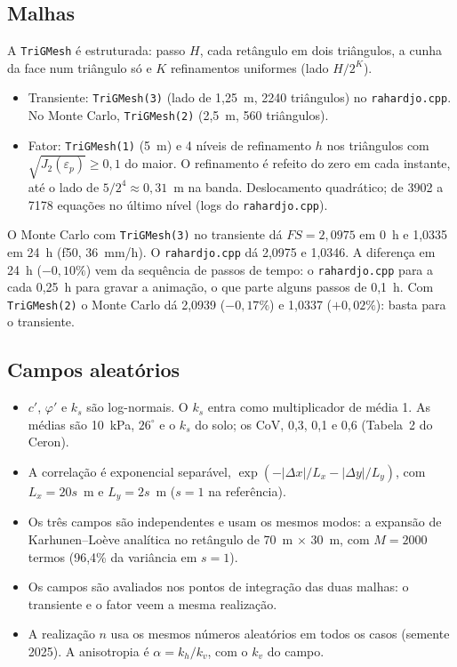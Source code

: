 \documentclass[11pt,a4paper]{article}
\begin{document}
\subsection{Malhas}
A \texttt{TriGMesh} é estruturada: passo $H$, cada retângulo em dois triângulos, a cunha da face num triângulo só e $K$
refinamentos uniformes (lado $H/2^K$).
\begin{itemize}
\item Transiente: \texttt{TriGMesh(3)} (lado de 1,25~m, 2240 triângulos) no \texttt{rahardjo.cpp}. No Monte Carlo,
\texttt{TriGMesh(2)} (2,5~m, 560 triângulos).
\item Fator: \texttt{TriGMesh(1)} (5~m) e 4 níveis de refinamento $h$ nos triângulos com
$\sqrt{J_2(\varepsilon_p)} \geq 0{,}1$ do maior. O refinamento é refeito do zero em cada instante, até o lado de
$5/2^4 \approx 0{,}31$~m na banda. Deslocamento quadrático; de 3902 a 7178 equações no último nível (logs do
\texttt{rahardjo.cpp}).
\end{itemize}
O Monte Carlo com \texttt{TriGMesh(3)} no transiente dá $FS = 2{,}0975$ em 0~h e 1,0335 em 24~h (f50, 36~mm/h). O
\texttt{rahardjo.cpp} dá 2,0975 e 1,0346. A diferença em 24~h ($-0{,}10\%$) vem da sequência de passos de tempo: o
\texttt{rahardjo.cpp} para a cada 0,25~h para gravar a animação, o que parte alguns passos de 0,1~h. Com \texttt{TriGMesh(2)} o Monte Carlo dá 2,0939
($-0{,}17\%$) e 1,0337 ($+0{,}02\%$): basta para o transiente.

\subsection{Campos aleatórios}
\begin{itemize}
\item $c'$, $\varphi'$ e $k_s$ são log-normais. O $k_s$ entra como multiplicador de média 1. As médias são 10~kPa,
$26^\circ$ e o $k_s$ do solo; os CoV, 0,3, 0,1 e 0,6 (Tabela~2 do Ceron).
\item A correlação é exponencial separável, $\exp(-|\Delta x|/L_x - |\Delta y|/L_y)$, com $L_x = 20s$~m e $L_y = 2s$~m
($s = 1$ na referência).
\item Os três campos são independentes e usam os mesmos modos: a expansão de Karhunen--Loève analítica no retângulo de
70~m $\times$ 30~m, com $M = 2000$ termos (96,4\% da variância em $s = 1$).
\item Os campos são avaliados nos pontos de integração das duas malhas: o transiente e o fator veem a mesma realização.
\item A realização $n$ usa os mesmos números aleatórios em todos os casos (semente 2025). A anisotropia é
$\alpha = k_h/k_v$, com o $k_v$ do campo.
\end{itemize}
\end{document}
